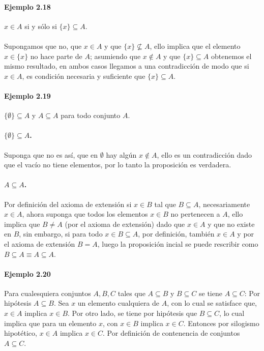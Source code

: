 \documentclass{article}
\begin{document}
	\paragraph{Ejemplo 2.18} $x \in A$ si y sólo si $\{x\} \subseteq A$.
	\paragraph{} Supongamos que no, que $x \in A$ y que $\{x\} \not \subseteq A$, ello implica que el elemento $x \in \{x\}$ no hace parte de $A$; asumiendo que $x \notin A$ y que $\{x\} \subseteq A$ obtenemos el mismo resultado, en ambos casos llegamos a una contradicción de modo que si $x \in A$, es condición necesaria y suficiente que $\{x\} \subseteq A.$
	\paragraph{Ejemplo 2.19} $\{\emptyset\} \subseteq A$ y $A \subseteq A$ para todo conjunto $A$.
	\paragraph{$\{\emptyset\} \subseteq A$.} Suponga que no es así, que en $\emptyset$ hay algún $x \notin A$, ello es un contradicción dado que el vacío no tiene elementos, por lo tanto la proposición es verdadera. 
	\paragraph{$A \subseteq A$.} Por definición del axioma de extensión si $x \in B$ tal que $B \subseteq A$, necesariamente $x \in A$, ahora suponga que todos los elementos $x \in B$ no pertenecen a $A$, ello implica que $B \neq A$ (por el axioma de extensión) dado que $x \in A$ y que no existe en $B$, sin embargo, si para todo  $x \in B \subseteq A$, por definición, también $x \in A$ y por el axioma de extensión $B = A$, luego la proposición incial se puede rescribir como $B \subseteq A \equiv A \subseteq A$.
	\paragraph{Ejemplo 2.20} Para cualesquiera conjuntos $A,B,C$ tales que $A \subseteq B$ y $B \subseteq C$ se tiene $A \subseteq C$:
	Por hipótesis $A \subseteq B$. Sea $x$ un elemento cualquiera de $A$, con lo cual se satisface que, $x \in A$ implica  $x \in B$.
	Por otro lado, se tiene por hipótesis que $B \subseteq C$, lo cual implica que para un elemento $x$, con $x \in B$ implica  $x \in C$. Entonces por silogismo hipotético, $x \in A$ implica $x \in C$.
	Por definición de contenencia de conjuntos $A \subseteq C$. 
\end{document}
